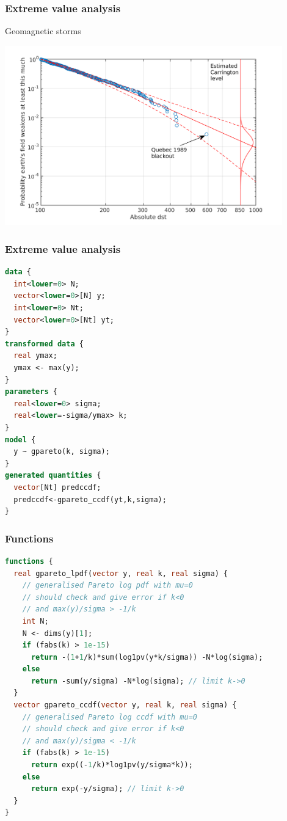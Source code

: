 \documentclass[10pt,handout]{beamer}
\begin{document}
\begin{frame}

\frametitle{Extreme value analysis}

Geomagnetic storms

\includegraphics[width=12cm]{figs/stan_gpareto_geomev.png}

\end{frame}

\begin{frame}[fragile]

\frametitle{Extreme value analysis}
  {\small
  \begin{lstlisting}[language=Stan]
data {
  int<lower=0> N;
  vector<lower=0>[N] y;
  int<lower=0> Nt;
  vector<lower=0>[Nt] yt;
}
transformed data {
  real ymax;
  ymax <- max(y);
}
parameters {
  real<lower=0> sigma;
  real<lower=-sigma/ymax> k;
}
model {
  y ~ gpareto(k, sigma);
}
generated quantities {
  vector[Nt] predccdf;
  predccdf<-gpareto_ccdf(yt,k,sigma);
}
  \end{lstlisting}
}
\end{frame}

\begin{frame}[fragile]

\frametitle{Functions}
  {\footnotesize
  \begin{lstlisting}[language=Stan]
functions {
  real gpareto_lpdf(vector y, real k, real sigma) {
    // generalised Pareto log pdf with mu=0
    // should check and give error if k<0
    // and max(y)/sigma > -1/k
    int N;
    N <- dims(y)[1];
    if (fabs(k) > 1e-15)
      return -(1+1/k)*sum(log1pv(y*k/sigma)) -N*log(sigma);
    else
      return -sum(y/sigma) -N*log(sigma); // limit k->0
  }
  vector gpareto_ccdf(vector y, real k, real sigma) {
    // generalised Pareto log ccdf with mu=0
    // should check and give error if k<0
    // and max(y)/sigma < -1/k
    if (fabs(k) > 1e-15)
      return exp((-1/k)*log1pv(y/sigma*k));
    else
      return exp(-y/sigma); // limit k->0
  }
}
  \end{lstlisting}
}
\end{frame}
\end{document}
